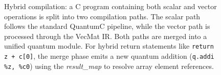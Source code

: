 \begin{figure}[t]

\caption{Hybrid compilation: a C program containing both scalar and vector operations is split into two compilation paths. The scalar path follows the standard QuantumC pipeline, while the vector path is processed through the VecMat IR. Both paths are merged into a unified quantum module. For hybrid return statements like \texttt{return z + c[0]}, the merge phase emits a new quantum addition (\texttt{q.addi \%z, \%c0}) using the \emph{result\_map} to resolve array element references.}
\label{fig:hybrid-compilation}

\end{figure}